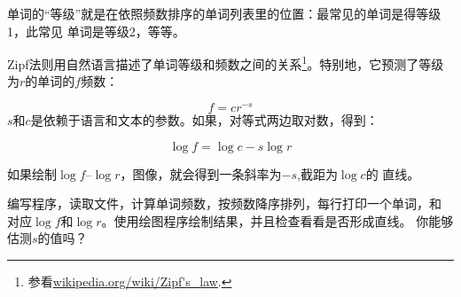 \begin{ex}


单词的“等级”就是在依照频数排序的单词列表里的位置：最常见的单词是得等级1，此常见
单词是等级2，等等。

Zipf法则用自然语言描述了单词等级和频数之间的关系\footnote{参看\url{wikipedia.org/wiki/Zipf's_law}.}。特别地，它预测了等级为$r$的单词的$f$频数：

\[ f = c r^{-s} \]
$s$和$c$是依赖于语言和文本的参数。如果，对等式两边取对数，得到：


\[ \log f = \log c - s \log r \]

如果绘制$\log f$--$\log r$，图像，就会得到一条斜率为$-s$,截距为$\log c$的
直线。

编写程序，读取文件，计算单词频数，按频数降序排列，每行打印一个单词，和
对应$\log f$和$\log r$。使用绘图程序绘制结果，并且检查看看是否形成直线。
你能够估测$s$的值吗？
\end{ex}















